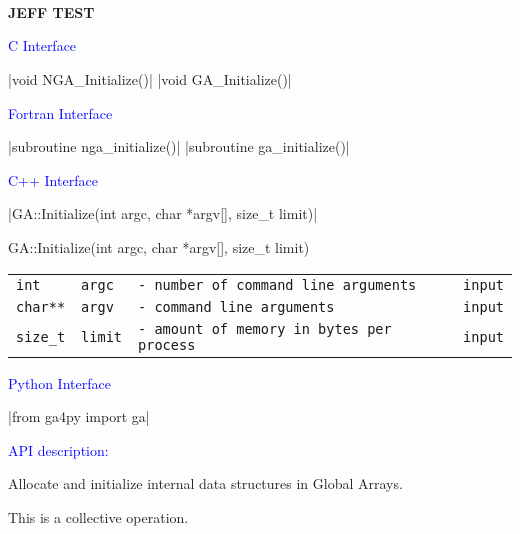 \documentclass[12pt]{article}
\newcommand{\apih}[1]{
\hspace*{\fill} \\ \\ \\
\color{black}
\noindent
\textbf{\LARGE
#1
\newline
}
}
\newenvironment{desc}{
\noindent
\textcolor{blue}{API description:}

}{}
\newenvironment{fapi}{
\noindent
\textcolor{blue}{Fortran Interface}
\small
}{
}
\newenvironment{capi}{
\noindent
\textcolor{blue}{C Interface}
\small
}{
}
\newenvironment{cxxapi}{
\noindent
\textcolor{blue}{C++ Interface}
\small
}{
}
\newenvironment{pyapi}{
\noindent
\textcolor{blue}{Python Interface}
\small
}{
}
\newenvironment{funcargs}{
\begin{tabular}{ p{0.2\textwidth} p{0.2\textwidth} p{0.5\textwidth} p{0.1\textwidth} }
}{
\end{tabular}
}
\newcommand{\funcarg}[4]{
\texttt{#1} & \texttt{#2} & \texttt{- #3} & \texttt{#4} \\
}
\begin{document}
\apih{JEFF TEST}

\begin{capi}
\cfuncsig|void NGA_Initialize()|
\cfuncsig|void GA_Initialize()|
\end{capi}

\begin{fapi}
\ffuncsig|subroutine nga_initialize()|
\ffuncsig|subroutine ga_initialize()|
\end{fapi}

\begin{cxxapi}
\cppfuncsig|GA::Initialize(int argc, char *argv[], size_t limit)|
\begin{cppcode}
GA::Initialize(int argc, char *argv[], size_t limit)
\end{cppcode}
\begin{funcargs}
\funcarg{int}{argc}{number of command line arguments}{input}
\funcarg{char**}{argv}{command line arguments}{input}
\funcarg{size_t}{limit}{amount of memory in bytes per process}{input}
\end{funcargs}
\end{cxxapi}

\begin{pyapi}
\pyfuncsig|from ga4py import ga|
\end{pyapi}

\begin{desc}
Allocate and initialize internal data structures in Global Arrays.

This is a collective operation.
\end{desc}
\end{document}
